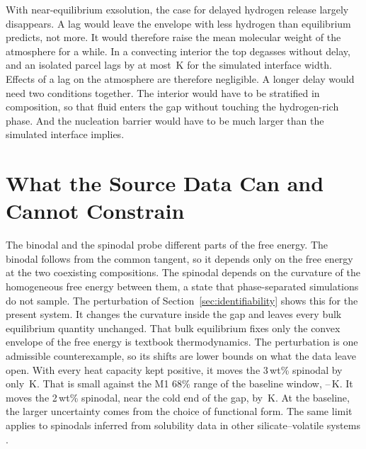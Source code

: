 With near-equilibrium exsolution, the case for delayed hydrogen release largely disappears. A lag
would leave the envelope with less hydrogen than equilibrium predicts, not more. It would
therefore raise the mean molecular weight of the atmosphere for a while. In a convecting interior the top degasses
without delay, and an isolated parcel lags by at most \dlyFigOneCPubHi{}\,K for the simulated
interface width. Effects of a lag on the atmosphere are therefore negligible. A longer delay would need two conditions together. The
interior would have to be stratified in composition, so that fluid enters the gap without
touching the hydrogen-rich phase. And the nucleation barrier would have to be much larger than
the simulated interface implies.

\section{What the Source Data Can and Cannot Constrain}\label{sec:why}

The binodal and the spinodal probe different parts of the free energy. The binodal follows from
the common tangent, so it depends only on the free energy at the two coexisting compositions.
The spinodal depends on the curvature of the homogeneous free energy between them, a state that
phase-separated simulations do not sample. The perturbation of Section~\ref{sec:identifiability}
shows this for the present system. It changes the curvature inside the gap and leaves every bulk
equilibrium quantity unchanged. That bulk equilibrium fixes only the convex envelope of the free
energy is textbook thermodynamics. The perturbation is one admissible counterexample, so its
shifts are lower bounds on what the data leave open. With every heat capacity kept positive, it
moves the 3\,wt\% spinodal by only \bumpThree{}\,K. That is small against the M1 68\% range of
the baseline window, \IntMOneTableLo{}--\IntMOneTableHi{}\,K. It moves the 2\,wt\% spinodal,
near the cold end of the gap, by \bumpTwo{}\,K. At the baseline, the larger uncertainty comes
from the choice of functional form. The same limit applies to spinodals inferred from solubility data in other silicate--volatile
systems \cite{nishiwaki2025}.

